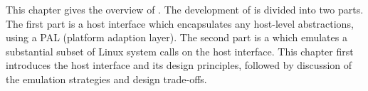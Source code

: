 This chapter gives the overview of \graphene{}.
The development of \graphene{} is divided into two parts.
The first part is a host interface which encapsulates any host-level abstractions,
using a PAL (platform adaption layer). %
The second part is a \libos{} which emulates a substantial subset of Linux system calls on the host interface.
This chapter first introduces the host interface and its design principles,
followed by discussion of the \libos{}
emulation strategies %
and design trade-offs.


